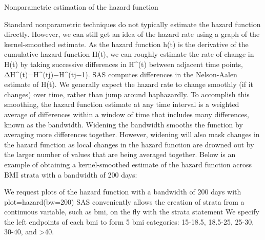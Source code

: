 Nonparametric estimation of the hazard function

Standard nonparametric techniques do not typically estimate the hazard function directly. However, we can still get an idea of the hazard rate using a graph of the kernel-smoothed estimate. As the hazard function h(t) is the derivative of the cumulative hazard function H(t), we can roughly estimate the rate of change in H(t) by taking successive differences in H^(t) between adjacent time points, ΔH^(t)=H^(tj)−H^(tj−1). SAS computes differences in the Nelson-Aalen estimate of H(t). We generally expect the hazard rate to change smoothly (if it changes) over time, rather than jump around haphazardly. To accomplish this smoothing, the hazard function estimate at any time interval is a weighted average of differences within a window of time that includes many differences, known as the bandwidth. Widening the bandwidth smooths the function by averaging more differences together. However, widening will also mask changes in the hazard function as local changes in the hazard function are drowned out by the larger number of values that are being averaged together. Below is an example of obtaining a kernel-smoothed estimate of the hazard function across BMI strata with a bandwidth of 200 days:

We request plots of the hazard function with a bandwidth of 200 days with plot=hazard(bw=200)
SAS conveniently allows the creation of strata from a continuous variable, such as bmi, on the fly with the strata statement We specify the left endpoints of each bmi to form 5 bmi categories: 15-18.5, 18.5-25, 25-30, 30-40, and >40.
